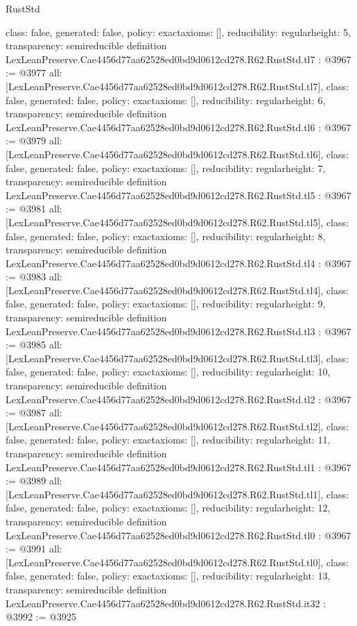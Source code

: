 \begin{lexlean}{RustStd}
\begin{coremodule}
{  class: false,
  generated: false,
  policy: exact{axioms: []},
  reducibility: regular{height: 5},
  transparency: semireducible
}
definition LexLeanPreserve.Cae4456d77aa62528ed0bd9d0612cd278.R62.RustStd.tl7 : @3967 := @3977 {
  all: [LexLeanPreserve.Cae4456d77aa62528ed0bd9d0612cd278.R62.RustStd.tl7],
  class: false,
  generated: false,
  policy: exact{axioms: []},
  reducibility: regular{height: 6},
  transparency: semireducible
}
definition LexLeanPreserve.Cae4456d77aa62528ed0bd9d0612cd278.R62.RustStd.tl6 : @3967 := @3979 {
  all: [LexLeanPreserve.Cae4456d77aa62528ed0bd9d0612cd278.R62.RustStd.tl6],
  class: false,
  generated: false,
  policy: exact{axioms: []},
  reducibility: regular{height: 7},
  transparency: semireducible
}
definition LexLeanPreserve.Cae4456d77aa62528ed0bd9d0612cd278.R62.RustStd.tl5 : @3967 := @3981 {
  all: [LexLeanPreserve.Cae4456d77aa62528ed0bd9d0612cd278.R62.RustStd.tl5],
  class: false,
  generated: false,
  policy: exact{axioms: []},
  reducibility: regular{height: 8},
  transparency: semireducible
}
definition LexLeanPreserve.Cae4456d77aa62528ed0bd9d0612cd278.R62.RustStd.tl4 : @3967 := @3983 {
  all: [LexLeanPreserve.Cae4456d77aa62528ed0bd9d0612cd278.R62.RustStd.tl4],
  class: false,
  generated: false,
  policy: exact{axioms: []},
  reducibility: regular{height: 9},
  transparency: semireducible
}
definition LexLeanPreserve.Cae4456d77aa62528ed0bd9d0612cd278.R62.RustStd.tl3 : @3967 := @3985 {
  all: [LexLeanPreserve.Cae4456d77aa62528ed0bd9d0612cd278.R62.RustStd.tl3],
  class: false,
  generated: false,
  policy: exact{axioms: []},
  reducibility: regular{height: 10},
  transparency: semireducible
}
definition LexLeanPreserve.Cae4456d77aa62528ed0bd9d0612cd278.R62.RustStd.tl2 : @3967 := @3987 {
  all: [LexLeanPreserve.Cae4456d77aa62528ed0bd9d0612cd278.R62.RustStd.tl2],
  class: false,
  generated: false,
  policy: exact{axioms: []},
  reducibility: regular{height: 11},
  transparency: semireducible
}
definition LexLeanPreserve.Cae4456d77aa62528ed0bd9d0612cd278.R62.RustStd.tl1 : @3967 := @3989 {
  all: [LexLeanPreserve.Cae4456d77aa62528ed0bd9d0612cd278.R62.RustStd.tl1],
  class: false,
  generated: false,
  policy: exact{axioms: []},
  reducibility: regular{height: 12},
  transparency: semireducible
}
definition LexLeanPreserve.Cae4456d77aa62528ed0bd9d0612cd278.R62.RustStd.tl0 : @3967 := @3991 {
  all: [LexLeanPreserve.Cae4456d77aa62528ed0bd9d0612cd278.R62.RustStd.tl0],
  class: false,
  generated: false,
  policy: exact{axioms: []},
  reducibility: regular{height: 13},
  transparency: semireducible
}
definition LexLeanPreserve.Cae4456d77aa62528ed0bd9d0612cd278.R62.RustStd.it32 : @3992 := @3925 {
}
\end{coremodule}
\end{lexlean}
